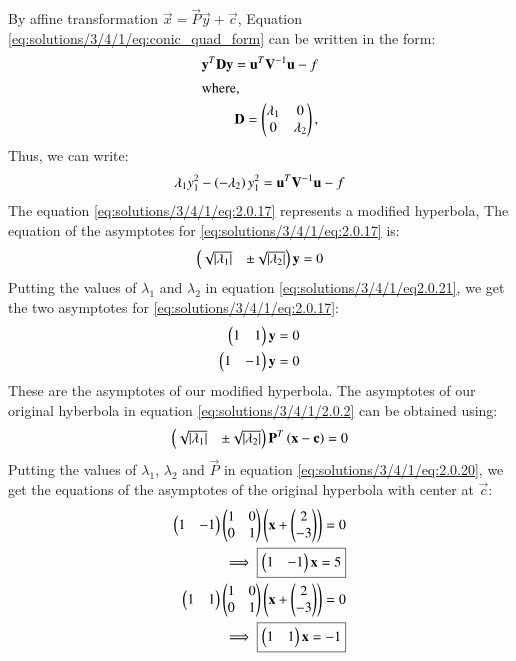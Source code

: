 By affine transformation $\vec{x} = \vec{P}\vec{y}+\vec{c} $,  Equation \eqref{eq:solutions/3/4/1/eq:conic_quad_form} can be written in the form:
\begin{align} 
\mathbf{y}^T\mathbf{D}\mathbf{y} =  \mathbf{u}^T\mathbf{V}^{-1}\mathbf{u} -f \\
\intertext{where,}
\mathbf{D} = \begin{pmatrix}\lambda_1 & 0\\ 0 & \lambda_2\end{pmatrix},
\label{eq:solutions/3/4/1/eq:quad_form_hyper}
\end{align}
Thus, we can write:
\begin{align}
    \lambda_1y_1^2 -\left(-\lambda_2\right)y_1^2 = \mathbf{u}^T\mathbf{V}^{-1}\mathbf{u} -f \label{eq:solutions/3/4/1/eq:2.0.17}
\end{align}
The equation \eqref{eq:solutions/3/4/1/eq:2.0.17} represents a modified hyperbola, The equation of the asymptotes for \eqref{eq:solutions/3/4/1/eq:2.0.17} is:
\begin{align} 
\begin{pmatrix}\sqrt{\left\vert\lambda_1\right\vert} & \pm \sqrt{\left\vert\lambda_2\right\vert}\end{pmatrix}\mathbf{y} = 0 \label{eq:solutions/3/4/1/eq2.0.21}
\end{align} 
Putting the values of $\lambda_1$ and $\lambda_2$ in equation \eqref{eq:solutions/3/4/1/eq2.0.21}, we get the two asymptotes for \eqref{eq:solutions/3/4/1/eq:2.0.17}:
\begin{align} 
\begin{pmatrix}1 & 1\end{pmatrix}\mathbf{y} = 0 \\
\begin{pmatrix}1 & -1\end{pmatrix}\mathbf{y} = 0
\end{align} 
These are the asymptotes of our modified hyperbola. The asymptotes of our original hyberbola in equation \eqref{eq:solutions/3/4/1/2.0.2} can be obtained using:
\begin{align} 
\begin{pmatrix}\sqrt{\left\vert\lambda_1\right\vert} & \pm \sqrt{\left\vert\lambda_2\right\vert}\end{pmatrix}\mathbf{P}^T\left(\mathbf{x}-\mathbf{c}\right) = 0
\label{eq:solutions/3/4/1/eq:2.0.20}
\end{align} 
Putting the values of $\lambda_1$, $\lambda_2$ and $\vec{P}$  in equation \eqref{eq:solutions/3/4/1/eq:2.0.20}, we get the equations of the asymptotes of the original hyperbola with center at $\Vec{c}$:
\begin{align} 
    \myvec{1 &-1}\myvec{1&0 \\0& 1}\brak{\vec{x}+\myvec{2 \\-3}}=0\\
    \implies \boxed{\myvec{1 &-1}\Vec{x}=5} \label{eq:solutions/3/4/1/2.0.26}\\
    \myvec{1 & 1}\myvec{1&0 \\0& 1}\brak{\vec{x}+\myvec{2 \\-3}}=0\\
     \implies \boxed{\myvec{1 &1}\Vec{x}=-1} \label{eq:solutions/3/4/1/2.0.28}
\end{align}

